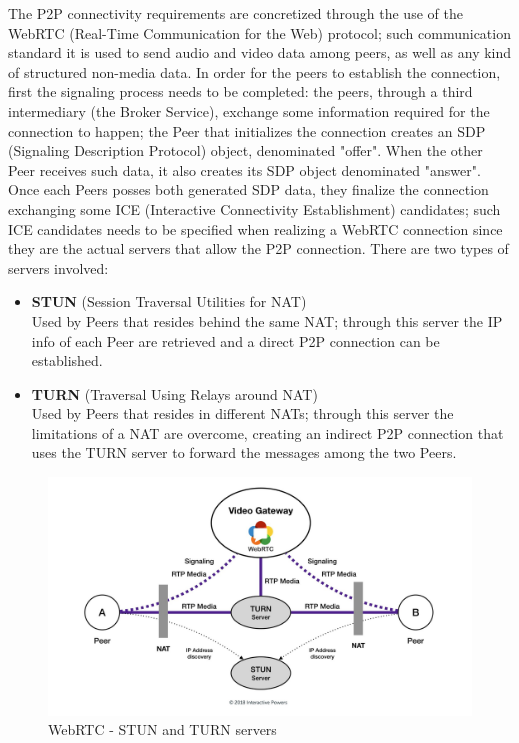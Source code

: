 The P2P connectivity requirements are concretized through the use of the WebRTC (Real-Time Communication for the Web) protocol; such communication standard it is used to send audio and video data among peers, as well as any kind of structured non-media data. In order for the peers to establish the connection, first the signaling process needs to be completed: the peers, through a third intermediary (the Broker Service), exchange some information required for the connection to happen; the Peer that initializes the connection creates an SDP (Signaling Description Protocol) object, denominated "offer". When the other Peer receives such data, it also creates its SDP object denominated "answer". Once each Peers posses both generated SDP data, they finalize the connection exchanging some ICE (Interactive Connectivity Establishment) candidates; such ICE candidates needs to be specified when realizing a WebRTC connection since they are the actual servers that allow the P2P connection. There are two types of servers involved:
\begin{itemize}
    \item \textbf{STUN} (Session Traversal Utilities for NAT)\\
    Used by Peers that resides behind the same NAT; through this server the IP info of each Peer are retrieved and a direct P2P connection can be established.
    \item \textbf{TURN} (Traversal Using Relays around NAT)\\
    Used by Peers that resides in different NATs; through this server the limitations of a NAT are overcome, creating an indirect P2P connection that uses the TURN server to forward the messages among the two Peers.
\end{itemize}

\begin{figure}[!ht]
    \centering
    \includegraphics[scale=0.15]{document/chapters/chapter_7/images/webrtc.jpeg}
    \caption{WebRTC - STUN and TURN servers \cite{stun_and_turn_servers}}
    \label{fig:webrtc}
\end{figure}

